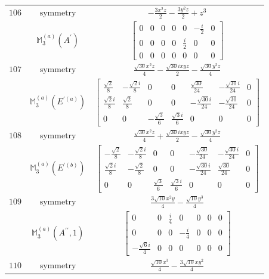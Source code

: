 \documentclass[fleqn,8pt,landscape]{jsarticle}
\begin{document}
\begin{longtable}{ccc}
$ 106 $ & $ \text{symmetry} $ & $ - \frac{3 x^{2} z}{2} - \frac{3 y^{2} z}{2} + z^{3} $ \\
$  $ & $ \mathbb{M}_{3}^{(a)}(A^{\prime}) $ & $ \begin{bmatrix} 0 & 0 & 0 & 0 & 0 & - \frac{i}{2} & 0 \\ 0 & 0 & 0 & 0 & \frac{i}{2} & 0 & 0 \\ 0 & 0 & 0 & 0 & 0 & 0 & 0 \end{bmatrix} $ \\ \hline
$ 107 $ & $ \text{symmetry} $ & $ \frac{\sqrt{30} x^{2} z}{4} - \frac{\sqrt{30} i x y z}{2} - \frac{\sqrt{30} y^{2} z}{4} $ \\
$  $ & $ \mathbb{M}_{3}^{(a)}(E^{\prime(a)}) $ & $ \begin{bmatrix} \frac{\sqrt{2}}{8} & - \frac{\sqrt{2} i}{8} & 0 & 0 & \frac{\sqrt{30}}{24} & - \frac{\sqrt{30} i}{24} & 0 \\ \frac{\sqrt{2} i}{8} & \frac{\sqrt{2}}{8} & 0 & 0 & - \frac{\sqrt{30} i}{24} & - \frac{\sqrt{30}}{24} & 0 \\ 0 & 0 & - \frac{\sqrt{3}}{6} & \frac{\sqrt{3} i}{6} & 0 & 0 & 0 \end{bmatrix} $ \\ \hline
$ 108 $ & $ \text{symmetry} $ & $ \frac{\sqrt{30} x^{2} z}{4} + \frac{\sqrt{30} i x y z}{2} - \frac{\sqrt{30} y^{2} z}{4} $ \\
$  $ & $ \mathbb{M}_{3}^{(a)}(E^{\prime(b)}) $ & $ \begin{bmatrix} - \frac{\sqrt{2}}{8} & - \frac{\sqrt{2} i}{8} & 0 & 0 & - \frac{\sqrt{30}}{24} & - \frac{\sqrt{30} i}{24} & 0 \\ \frac{\sqrt{2} i}{8} & - \frac{\sqrt{2}}{8} & 0 & 0 & - \frac{\sqrt{30} i}{24} & \frac{\sqrt{30}}{24} & 0 \\ 0 & 0 & \frac{\sqrt{3}}{6} & \frac{\sqrt{3} i}{6} & 0 & 0 & 0 \end{bmatrix} $ \\ \hline
$ 109 $ & $ \text{symmetry} $ & $ \frac{3 \sqrt{10} x^{2} y}{4} - \frac{\sqrt{10} y^{3}}{4} $ \\
$  $ & $ \mathbb{M}_{3}^{(a)}(A^{\prime\prime},1) $ & $ \begin{bmatrix} 0 & 0 & \frac{i}{4} & 0 & 0 & 0 & 0 \\ 0 & 0 & 0 & - \frac{i}{4} & 0 & 0 & 0 \\ - \frac{\sqrt{6} i}{4} & 0 & 0 & 0 & 0 & 0 & 0 \end{bmatrix} $ \\ \hline
$ 110 $ & $ \text{symmetry} $ & $ \frac{\sqrt{10} x^{3}}{4} - \frac{3 \sqrt{10} x y^{2}}{4} $ \\

\end{longtable}
\end{document}
